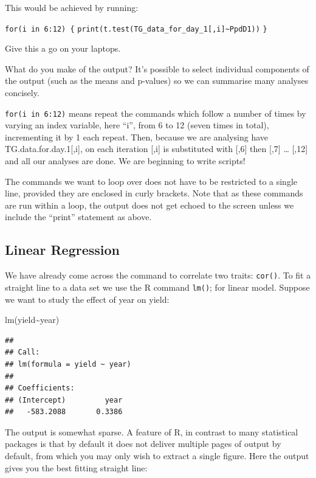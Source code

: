 \documentclass[
]{book}
\newenvironment{Shaded}{\begin{snugshade}}{\end{snugshade}}
\newcommand{\FunctionTok}[1]{\textcolor[rgb]{0.00,0.00,0.00}{#1}}
\newcommand{\NormalTok}[1]{#1}
\newcommand{\SpecialCharTok}[1]{\textcolor[rgb]{0.00,0.00,0.00}{#1}}
\begin{document}
This would be achieved by running:

\texttt{for(i\ in\ 6:12)\ \{}
\texttt{print(t.test(TG\_data\_for\_day\_1{[},i{]}\textasciitilde{}PpdD1))}
\texttt{\}}

Give this a go on your laptops.

What do you make of the output? It's possible to select individual components of the output (such as the means and p-values) so we can summarise many analyses concisely.

\texttt{for(i\ in\ 6:12)} means repeat the commands which follow a number of times by varying an index variable, here ``i'', from 6 to 12 (seven times in total), incrementing it by 1 each repeat. Then, because we are analysing have TG.data.for.day.1{[},i{]}, on each iteration {[},i{]} is substituted with {[},6{]} then {[},7{]} \ldots{} {[},12{]} and all our analyses are done. We are beginning to write scripts!

The commands we want to loop over does not have to be restricted to a single line, provided they are enclosed in curly brackets. Note that as these commands are run within a loop, the output does not get echoed to the screen unless we include the ``print'' statement as above.

\hypertarget{linear-regression}{%
\subsection{Linear Regression}\label{linear-regression}}

We have already come across the command to correlate two traits: \texttt{cor()}. To fit a straight line to a data set we use the R command \texttt{lm()}; for linear model. Suppose we want to study the effect of year on yield:

\begin{Shaded}
\begin{Highlighting}[]
\FunctionTok{lm}\NormalTok{(yield}\SpecialCharTok{\textasciitilde{}}\NormalTok{year)}
\end{Highlighting}
\end{Shaded}

\begin{verbatim}
## 
## Call:
## lm(formula = yield ~ year)
## 
## Coefficients:
## (Intercept)         year  
##   -583.2088       0.3386
\end{verbatim}

The output is somewhat sparse. A feature of R, in contrast to many statistical packages is that by default it does not deliver multiple pages of output by default, from which you may only wish to extract a single figure. Here the output gives you the best fitting straight line:
\end{document}
